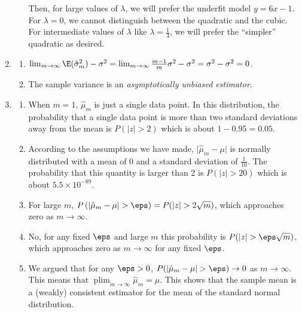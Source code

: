 \documentclass{article}
\DeclareMathOperator*{\plim}{plim}
\begin{document}
\begin{enumerate}
\begin{enumerate}
    Then, for large values of $\lambda$, we will prefer the underfit model $y = 6x - 1$. For $\lambda = 0$, we cannot distinguish between the quadratic and the cubic. For intermediate values of $\lambda$ like $\lambda = \frac13$, we will prefer the ``simpler'' quadratic as desired. 
\end{enumerate}

\item \label{ML_ex_bias_solution}
\begin{enumerate}
    \item $\lim_{m\to\infty} \E(\hat{\sigma}_m^2) - \sigma^2 = \lim_{m\to\infty} \frac{m-1}{m}\sigma^2 - \sigma^2 = \sigma^2 - \sigma^2 = 0$.
    \item The sample variance is an \emph{asymptotically unbiased estimator}.
\end{enumerate}

\item \label{ML_ex_consistency_solution}
\begin{enumerate} 
    \item When $m=1$, $\hat{\mu}_m$ is just a single data point. In this distribution, the probability that a single data point is more than two standard deviations away from the mean is $P(|z| > 2)$ which is about $1 -0.95 = 0.05$.
    \item According to the assumptions we have made, $\lvert \hat{\mu}_m - \mu \rvert$ is normally distributed with a mean of 0 and a standard deviation of $\frac{1}{10}$. The probability that this quantity is larger than 2 is $P(|z| > 20)$ which is about $5.5 \times 10^{-89}$.
    \item For large $m$, $P\left(\lvert \hat{\mu}_m - \mu \rvert > \eps \right) = P(|z| > 2 \sqrt{m})$, which approaches zero as $m \to \infty$.
    \item No, for any fixed $\eps$ and large $m$ this probability is $P(|z| > \eps\sqrt{m})$, which approaches zero as $m \to \infty$ for any fixed $\eps$.
    \item We argued that for any $\eps > 0$, $P(\lvert \hat{\mu}_m - \mu \rvert > \eps) \to 0$ as $m \to \infty$. This means that $\plim_{m \to \infty} \hat{\mu}_m = \mu$. This shows that the sample mean is a (weakly) consistent estimator for the mean of the standard normal distribution.
\end{enumerate}


\end{enumerate}
\end{document}
